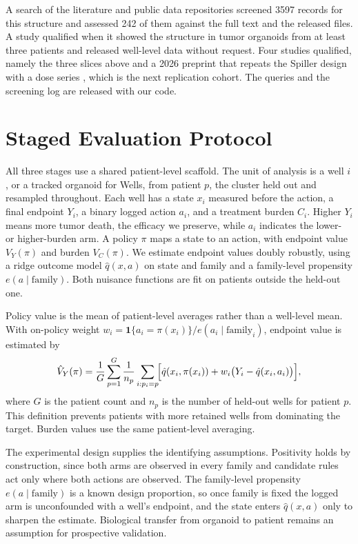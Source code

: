 \documentclass[conference]{IEEEtran}
\begin{document}
A search of the literature and public data repositories screened 3597 records for this structure and assessed 242 of them against the full text and the released files. A study qualified when it showed the structure in tumor organoids from at least three patients and released well-level data without request. Four studies qualified, namely the three slices above and a 2026 preprint that repeats the Spiller design with a dose series \cite{kim2026}, which is the next replication cohort. The queries and the screening log are released with our code.

\section{Staged Evaluation Protocol}

All three stages use a shared patient-level scaffold. The unit of analysis is a well \(i\), or a tracked organoid for Wells, from patient \(p\), the cluster held out and resampled throughout. Each well has a state \(x_i\) measured before the action, a final endpoint \(Y_i\), a binary logged action \(a_i\), and a treatment burden \(C_i\). Higher \(Y_i\) means more tumor death, the efficacy we preserve, while \(a_i\) indicates the lower- or higher-burden arm. A policy \(\pi\) maps a state to an action, with endpoint value \(V_Y(\pi)\) and burden \(V_C(\pi)\). We estimate endpoint values doubly robustly, using a ridge outcome model \(\hat q(x,a)\) on state and family and a family-level propensity \(e(a\mid\mathrm{family})\). Both nuisance functions are fit on patients outside the held-out one.

Policy value is the mean of patient-level averages rather than a well-level mean. With on-policy weight \(w_i=\mathbf 1\{a_i=\pi(x_i)\}/e(a_i\mid\mathrm{family}_i)\), endpoint value is estimated by
\begin{equation}
\hat V_Y(\pi)=\frac{1}{G}\sum_{p=1}^{G}\frac{1}{n_p}\sum_{i:p_i=p}\!\Bigl[\hat q(x_i,\pi(x_i))+w_i\bigl(Y_i-\hat q(x_i,a_i)\bigr)\Bigr],
\end{equation}
where \(G\) is the patient count and \(n_p\) is the number of held-out wells for patient \(p\). This definition prevents patients with more retained wells from dominating the target. Burden values use the same patient-level averaging.

The experimental design supplies the identifying assumptions. Positivity holds by construction, since both arms are observed in every family and candidate rules act only where both actions are observed. The family-level propensity \(e(a\mid\mathrm{family})\) is a known design proportion, so once family is fixed the logged arm is unconfounded with a well's endpoint, and the state enters \(\hat q(x,a)\) only to sharpen the estimate. Biological transfer from organoid to patient remains an assumption for prospective validation.
\end{document}
